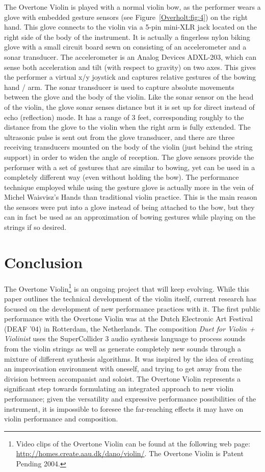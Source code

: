 The Overtone Violin is played with a normal violin bow, as the performer wears a
glove with embedded gesture sensors (see Figure~\ref{Overholt:fig:4}) on the right hand. This glove
connects to the violin via a 5-pin mini-XLR jack located on the right side of the
body of the instrument. It is actually a fingerless nylon biking glove with a
small circuit board sewn on consisting of an accelerometer and a sonar
transducer. The accelerometer is an Analog Devices ADXL-203, which can sense both
acceleration and tilt (with respect to gravity) on two axes. This gives the
performer a virtual x/y joystick and captures relative gestures of the bowing
hand / arm. The sonar transducer is used to capture absolute movements between
the glove and the body of the violin. Like the sonar sensor on the head of the
violin, the glove sonar senses distance but it is set up for direct instead of
echo (reflection) mode. It has a range of 3 feet, corresponding roughly to the
distance from the glove to the violin when the right arm is fully extended. The
ultrasonic pulse is sent out from the glove transducer, and there are three
receiving transducers mounted on the body of the violin (just behind the string
support) in order to widen the angle of reception. The glove sensors provide the
performer with a set of gestures that are similar to bowing, yet can be used in a
completely different way (even without holding the bow). The performance
technique employed while using the gesture glove is actually more in the vein of
Michel Waisvisz's Hands \cite{Waisvisz:1985} than traditional violin practice. This is the main
reason the sensors were put into a glove instead of being attached to the bow,
but they can in fact be used as an approximation of bowing gestures while playing
on the strings if so desired.

\section{Conclusion}

The Overtone Violin\footnote{Video clips of the Overtone Violin can be found at the following web page:
\url{http://homes.create.aau.dk/dano/violin/}. The Overtone Violin is Patent Pending 2004.}
 is an ongoing project that will keep evolving. While this
paper outlines the technical development of the violin itself, current research
has focused on the development of new performance practices with it. The first
public performance with the Overtone Violin was at the Dutch Electronic Art
Festival (DEAF '04) in Rotterdam, the Netherlands.  The composition \textit{Duet
for Violin + Violinist} uses the SuperCollider 3 audio synthesis language to
process sounds from the violin strings as well as generate completely new sounds
through a mixture of different synthesis algorithms. It was inspired by the idea
of creating an improvisation environment with oneself, and trying to get away
from the division between accompanist and soloist. The Overtone Violin represents
a significant step towards formulating an integrated approach to new violin
performance; given the versatility and expressive performance possibilities of
the instrument, it is impossible to foresee the far-reaching effects it may have
on violin performance and composition.


